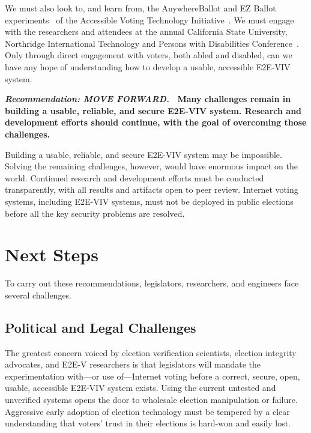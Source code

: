 We must also look to, and learn from, the AnywhereBallot and EZ Ballot
experiments~\cite{AnywhereBallot,lee2012ez} of the Accessible Voting
Technology Initiative~\cite{AVTI}.  We must engage with the
researchers and attendees at the annual California State University,
Northridge International Technology and Persons with Disabilities
Conference~\cite{CSUN}. Only through direct engagement with voters,
both abled and disabled, can we have any hope of understanding how to
develop a usable, accessible E2E-VIV system.

\vspace{12pt} 

\textbf{\emph{Recommendation: MOVE FORWARD.} \ Many challenges remain
  in building a usable, reliable, and secure E2E-VIV system. Research
  and development efforts should continue, with the goal of overcoming
  those challenges.}

Building a usable, reliable, and secure E2E-VIV system may be
impossible. Solving the remaining challenges, however, would have
enormous impact on the world. Continued research and development
efforts must be conducted transparently, with all results and
artifacts open to peer review. Internet voting systems, including
E2E-VIV systems, must not be deployed in public elections before all
the key security problems are resolved.

\section{Next Steps}
\label{sec:next-steps}

To carry out these recommendations, legislators, researchers, and
engineers face several challenges.

\subsection{Political and Legal Challenges}

The greatest concern voiced by election verification scientists,
election integrity advocates, and E2E-V researchers is that
legislators will mandate the experimentation with---or use
of---Internet voting before a correct, secure, open, usable,
accessible E2E-VIV system exists. Using the current untested and
unverified systems opens the door to wholesale election manipulation
or failure. Aggressive early adoption of election technology must be
tempered by a clear understanding that voters' trust in their
elections is hard-won and easily lost.

